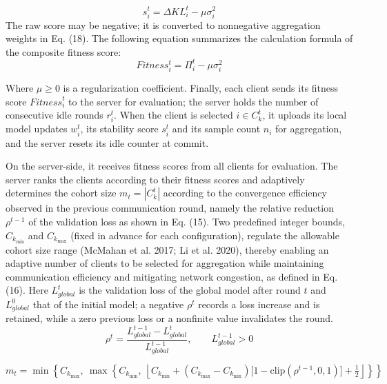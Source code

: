 \documentclass[pdflatex,sn-mathphys-num,oneside]{sn-jnl}%
\theoremstyle{thmstyleone}%
\theoremstyle{thmstyletwo}%
\theoremstyle{thmstylethree}%
\begin{document}
\begin{equation}
s_i^t = \Delta KL_i^t - \mu \sigma_i^2
\label{eq:stability}
\end{equation}
The raw score may be negative; it is converted to nonnegative aggregation weights in Eq. (18). The following equation summarizes the calculation formula of the composite fitness score:
\begin{equation}
Fitness_i^t = \Pi_i^t - \mu \sigma_i^2
\label{eq:fitness}
\end{equation}

Where $\mu \ge 0$ is a regularization coefficient. Finally, each client sends its fitness score ${Fitness}_i^t$ to the server for evaluation; the server holds the number of consecutive idle rounds $r_i^t$. When the client is selected $i\in C_k^t$, it uploads its local model updates $w_i^t$, its stability score $s_i^t$ and its sample count $n_i$ for aggregation, and the server resets its idle counter at commit.

On the server-side, it receives fitness scores from all clients for evaluation. The server ranks the clients according to their fitness scores and adaptively determines the cohort size $m_t=|C_k^t|$ according to the convergence efficiency observed in the previous communication round, namely the relative reduction $\rho^{t-1}$ of the validation loss as shown in Eq. (15). Two predefined integer bounds, $C_{k_{\min}}$ and $C_{k_{\max}}$ (fixed in advance for each configuration), regulate the allowable cohort size range (McMahan et al. 2017; Li et al. 2020), thereby enabling an adaptive number of clients to be selected for aggregation while maintaining communication efficiency and mitigating network congestion, as defined in Eq. (16). Here $L_{global}^{t}$ is the validation loss of the global model after round $t$ and $L_{global}^{0}$ that of the initial model; a negative $\rho^{t}$ records a loss increase and is retained, while a zero previous loss or a nonfinite value invalidates the round.
\begin{equation}
\rho^{t} = \frac{L_{{global}}^{t-1} - L_{{global}}^{t}}{L_{{global}}^{t-1}},\qquad L_{{global}}^{t-1}>0
\label{eq:convergence}
\end{equation}

\begin{equation}
m_t = \min\left\{C_{k_{\max}},\ \max\left\{C_{k_{\min}},\ \left\lfloor C_{k_{\min}} + (C_{k_{\max}} - C_{k_{\min}})\big[1-\mathrm{clip}(\rho^{t-1},0,1)\big] + \tfrac{1}{2}\right\rfloor\right\}\right\}
\label{eq:ck_selection}
\end{equation}
\end{document}
